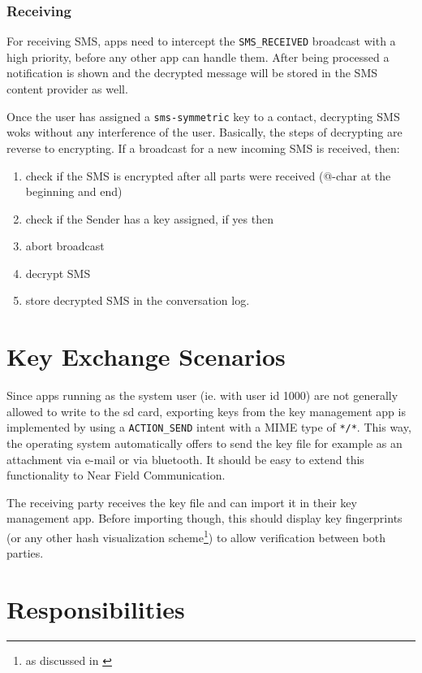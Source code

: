 \documentclass[a4paper,draft]{scrartcl}
\begin{document}
		\subsubsection{Receiving}
      For receiving SMS, apps need to intercept the \texttt{SMS\_RECEIVED} broadcast with a high priority, before any other app can handle them. After being processed a notification is shown and the decrypted message will be stored in the SMS content provider as well.
      
      Once the user has assigned a \texttt{sms-symmetric} key to a contact, decrypting SMS woks without any interference of the user. Basically, the steps of decrypting are reverse to encrypting. If a broadcast for a new incoming SMS is received, then:
			\begin{enumerate}
				\item check if the SMS is encrypted after all parts were received (@-char at the beginning and end)
				\item check if the Sender has a key assigned, if yes then
				\item abort broadcast
				\item decrypt SMS
				\item store decrypted SMS in the conversation log.
			\end{enumerate}

\section{Key Exchange Scenarios}
	Since apps running as the system user (ie. with user id 1000) are not generally allowed to write to the sd card,
	exporting keys from the key management app is implemented by using a \texttt{ACTION\_SEND} intent with a MIME type
	of \texttt{*/*}. This way, the operating system automatically offers to send the key file for example as an attachment
	via e-mail or via bluetooth. It should be easy to extend this functionality to Near Field Communication.

	The receiving party receives the key file and can import it in their key management app. Before importing though,
	this should display key fingerprints (or any other hash visualization scheme\footnote{as discussed in \cite{perrig99}})
	to allow verification between both parties.
	
\section{Responsibilities}
	
\end{document}
